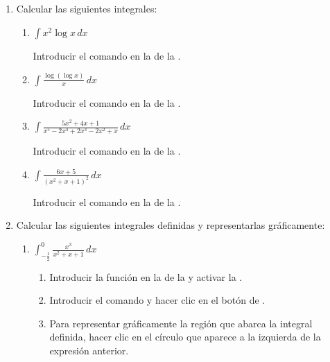 \begin{enumerate}[leftmargin=*]
\item Calcular las siguientes integrales:
      \begin{enumerate}
      \item $ \int{x^2 \log x\,dx}$
            \begin{indication}
            Introducir el comando  en la  de la .
            \end{indication}

      \item $\displaystyle \int \frac{\log(\log x)}{x}\,dx$
            \begin{indication}
            Introducir el comando  en la  de la .
            \end{indication}

      \item $\displaystyle \int \frac{5x^{2}+4x+1}{x^{5}-2x^{4}+2x^{3}-2x^{2}+x}\,dx$
            \begin{indication}
            Introducir el comando  en la  de la .
            \end{indication}

      \item $\displaystyle \int \frac{6x+5}{(x^{2}+x+1)^{2}}\,dx$
            \begin{indication}
            Introducir el comando  en la  de la .
            \end{indication}
      \end{enumerate}


\item Calcular las siguientes integrales definidas y representarlas gráficamente:
      \begin{enumerate}
      \item $\displaystyle \int_{-\frac{1}{2}}^0 \frac{x^{3}}{x^{2}+x+1}\,dx$
            \begin{indication}
            \begin{enumerate}
            \item Introducir la función  en la  de la  y activar la .
            \item Introducir el comando  y hacer clic en el botón de .
            \item Para representar gráficamente la región que abarca la integral definida, hacer clic en el círculo que aparece a la izquierda de la expresión anterior.
            \end{enumerate}
            \end{indication}


\end{enumerate}
\end{enumerate}
